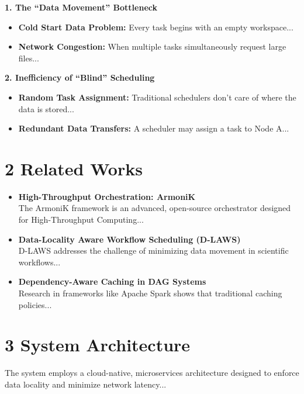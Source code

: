 \documentclass[12pt,a4paper]{report}
\begin{document}
\vspace{0.5cm}
\noindent \textbf{1. The ``Data Movement'' Bottleneck}\\
\begin{itemize}
    \item \textbf{Cold Start Data Problem:} Every task begins with an empty workspace...
    \item \textbf{Network Congestion:} When multiple tasks simultaneously request large files...
\end{itemize}

\vspace{0.5cm}
\noindent \textbf{2. Inefficiency of ``Blind'' Scheduling}\\
\begin{itemize}
    \item \textbf{Random Task Assignment:} Traditional schedulers don't care of where the data is stored...
    \item \textbf{Redundant Data Transfers:} A scheduler may assign a task to Node A...
\end{itemize}

\chapter{2 \hspace{0.2cm} Related Works}
\begin{itemize}
    \item \textbf{High-Throughput Orchestration: ArmoniK}\\
    The ArmoniK framework is an advanced, open-source orchestrator designed for High-Throughput Computing...
    \item \textbf{Data-Locality Aware Workflow Scheduling (D-LAWS)}\\
    D-LAWS addresses the challenge of minimizing data movement in scientific workflows...
    \item \textbf{Dependency-Aware Caching in DAG Systems}\\
    Research in frameworks like Apache Spark shows that traditional caching policies...
\end{itemize}

\chapter{3 \hspace{0.2cm} System Architecture}
The system employs a cloud-native, microservices architecture designed to enforce data locality and minimize network latency...
\end{document}

